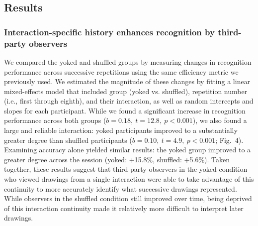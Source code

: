 \documentclass[10pt,letterpaper]{article}
\newcommand{\ndg}[1]{{\textcolor{Green}{[ndg: #1]}}}
\begin{document}
\subsection{Results}

\subsubsection{Interaction-specific history enhances recognition by third-party observers}



We compared the yoked and shuffled groups by measuring changes in recognition performance across successive repetitions using the same efficiency metric we previously used.
We estimated the magnitude of these changes by fitting a linear mixed-effects model that included group (yoked vs. shuffled), repetition number (i.e., first through eighth), and their interaction, as well as random intercepts and slopes for each participant.
While we found a significant increase in recognition performance across both groups ($b = 0.18, ~t = 12.8, ~p < 0.001$), %
we also found a large and reliable interaction:
yoked participants improved to a substantially greater degree than shuffled participants ($b = 0.10, ~t = 4.9, ~p<0.001$; Fig.~4).
Examining accuracy alone yielded similar results: the yoked group improved to a greater degree across the session (yoked: +15.8\%, shuffled: +5.6\%).
Taken together, these results suggest that third-party observers in the yoked condition who viewed drawings from a single interaction were able to take advantage of this continuity to more accurately identify what successive drawings represented.
While observers in the shuffled condition still improved over time, being deprived of this interaction continuity made it relatively more difficult to interpret later drawings.
\end{document}
